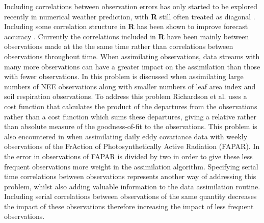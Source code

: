 \documentclass[review]{elsarticle}
\begin{document}
Including correlations between observation errors has only started to be explored recently in numerical weather prediction, with \textbf{R} still often treated as diagonal \citep{Stewart2013}. Including some correlation structure in \textbf{R} has been shown to improve forecast accuracy \citep{weston2014accounting}. Currently the correlations included in \textbf{R} have been mainly between observations made at the the same time rather than correlations between observations throughout time. When assimilating observations, data streams with many more observations can have a greater impact on the assimilation than those with fewer observations. In \citet{richardson2010estimating} this problem is discussed when assimilating large numbers of NEE observations along with smaller numbers of leaf area index and soil respiration observations. To address this problem Richardson et al. uses a cost function that calculates the product of the departures from the observations rather than a cost function which sums these departures, giving a relative rather than absolute measure of the goodness-of-fit to the observations. This problem is also encountered in \citet{Bacour2015} when assimilating daily eddy covariance data with weekly observations of the FrAction of Photosynthetically Active Radiation (FAPAR). In \citet{Bacour2015} the error in observations of FAPAR is divided by two in order to give these less frequent observations more weight in the assimilation algorithm. Specifying serial time correlations between observations represents another way of addressing this problem, whilst also adding valuable information to the data assimilation routine. Including serial correlations between observations of the same quantity decreases the impact of these observations \citep{jarvinen1999variational} therefore increasing the impact of less frequent observations. 
\end{document}
